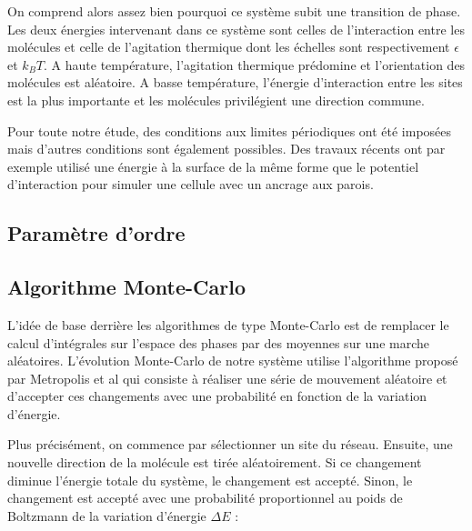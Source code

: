 \documentclass[11pt,a4paper]{article}
\numberwithin{equation}{section}
\begin{document}
On comprend alors assez bien pourquoi ce système subit une transition de phase. Les deux énergies intervenant dans ce système sont celles de l'interaction entre les molécules et celle de l'agitation thermique dont les échelles sont respectivement $\epsilon$ et $k_B T$.
A haute température, l'agitation thermique prédomine et l'orientation des molécules est aléatoire. A basse température, l'énergie d'interaction entre les sites est la plus importante et les molécules privilégient une direction commune.\medskip

Pour toute notre étude, des conditions aux limites périodiques ont été imposées mais d'autres conditions sont également possibles. Des travaux récents \cite{confined} ont par exemple utilisé une énergie à la surface de la même forme que le potentiel d'interaction pour simuler une cellule avec un ancrage aux parois. 


\subsection{Paramètre d'ordre}

\subsection{Algorithme Monte-Carlo}

L'idée de base derrière les algorithmes de type Monte-Carlo est de remplacer le calcul d'intégrales sur l'espace des phases par des moyennes sur une marche aléatoires. L'évolution Monte-Carlo de notre système utilise l'algorithme proposé par Metropolis et al \cite{metropolis} qui consiste à réaliser une série de mouvement aléatoire et d'accepter ces changements avec une probabilité en fonction de la variation d'énergie.\medskip

Plus précisément, on commence par sélectionner un site du réseau. Ensuite, une nouvelle direction de la molécule est tirée aléatoirement. Si ce changement diminue l'énergie totale du système, le changement est accepté. Sinon, le changement est accepté avec une probabilité proportionnel au poids de Boltzmann de la variation d'énergie $\Delta E$ :
\end{document}
